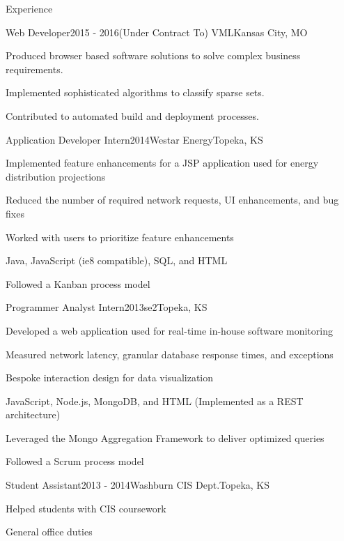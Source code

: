 \documentclass{structure} %
\begin{document}
\begin{rSection}{Experience}

\begin{rSubsection}{Web Developer}{2015 - 2016}{(Under Contract To) VML}{Kansas City, MO}
\item Produced browser based software solutions to solve complex business requirements.
\item Implemented sophisticated algorithms to classify sparse sets.
\item Contributed to automated build and deployment processes.
\end{rSubsection}


\begin{rSubsection}{Application Developer Intern}{2014}{Westar Energy}{Topeka, KS}
\item Implemented feature enhancements for a JSP application used for energy distribution projections
\item Reduced the number of required network requests, UI enhancements, and bug fixes
\item Worked with users to prioritize feature enhancements
\item Java, JavaScript (ie8 compatible), SQL, and HTML
\item Followed a Kanban process model
\end{rSubsection}


\begin{rSubsection}{Programmer Analyst Intern}{2013}{se2}{Topeka, KS}
\item Developed a web application used for real-time in-house software monitoring
\item Measured network latency, granular database response times, and exceptions
\item Bespoke interaction design for data visualization
\item JavaScript, Node.js, MongoDB, and HTML (Implemented as a REST architecture)
\item Leveraged the Mongo Aggregation Framework to deliver optimized queries
\item Followed a Scrum process model
\end{rSubsection}


\begin{rSubsection}{Student Assistant}{2013 - 2014}{Washburn CIS Dept.}{Topeka, KS}
\item Helped students with CIS coursework
\item General office duties
\end{rSubsection}


\end{rSection}
\end{document}

